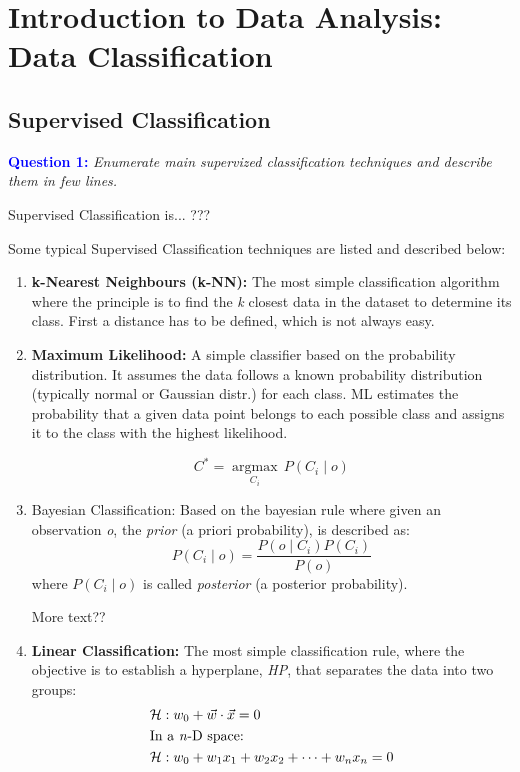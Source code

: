 \section{Introduction to Data Analysis: Data Classification}
\label{sec:data_analysis}

\subsection{Supervised Classification}
\textcolor{blue}{\textbf{Question 1:}}
\textit{Enumerate main supervized classiﬁcation techniques and describe them in few lines.}

Supervised Classification is... ???

Some typical Supervised Classification techniques are listed and described below:
\begin{enumerate}
    \item \textbf{k-Nearest Neighbours (k-NN):} The most simple classification algorithm where the principle is to find the \textit{k} closest data in the dataset to determine its class. 
    First a distance has to be defined, which is not always easy.

    
    \item \textbf{Maximum Likelihood:} A simple classifier based on the probability distribution.
    It assumes the data follows a known probability distribution (typically normal or Gaussian distr.) for each class.
    ML estimates the probability that a given data point belongs to each possible class and assigns it to the class with the highest likelihood.

    \begin{equation*}
        C^* = \underset{C_i}{\operatorname{argmax}} \, P(C_i \mid o)
    \end{equation*}

    
    \item Bayesian Classification:
    Based on the bayesian rule where given an observation \textit{o}, the \textit{prior} (a priori probability), is described as:
    \begin{equation*}
        P(C_i \mid o) = \frac{P(o \mid C_i) P(C_i)}{P(o)}
    \end{equation*}
    where $P(C_i \mid o)$ is called \textit{posterior} (a posterior probability).

    More text??

    
    \item \textbf{Linear Classification:}
    The most simple classification rule, where the objective is to establish a hyperplane, \textit{HP}, that separates the data into two groups:
    \begin{equation*}
    \begin{split}
        &\mathcal{H} : w_0 + \vec{w} \cdot \vec{x} = 0 \\
        &\text{In a \textit{n}-D space:} \\
        &\mathcal{H} : w_0 + w_1 x_1 + w_2 x_2 + \cdots + w_n x_n = 0
    \end{split}
    \end{equation*}


\end{enumerate}
